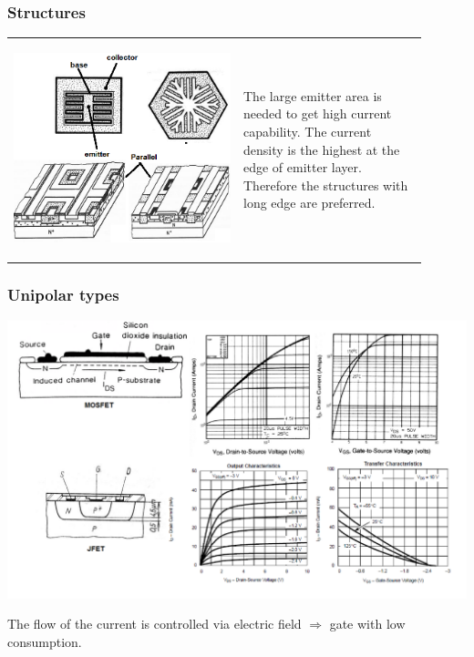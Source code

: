 \documentclass{beamer}
\begin{document}
	\begin{frame}
    \frametitle{Structures}
		\small
		\begin{tabular}{m{0.5\linewidth} m{0.4\linewidth}}
		\begin{center}
			\includegraphics[scale=0.35]{obr15_npnStruktury.png} 
		\end{center} &
		
		The large emitter area is needed to get high current capability. The current density is the highest at the edge of emitter layer. Therefore the structures with long edge are preferred.
		 
		\end{tabular}
	\end{frame}
	\begin{frame}
    \frametitle{Unipolar types}
		\begin{center}
			\includegraphics[scale=0.25]{obr16_mosTechnology.png} 
		\end{center}
		\small
		The flow of the current is controlled via electric field $\Rightarrow$ gate with low consumption.

	\end{frame}
\end{document}
